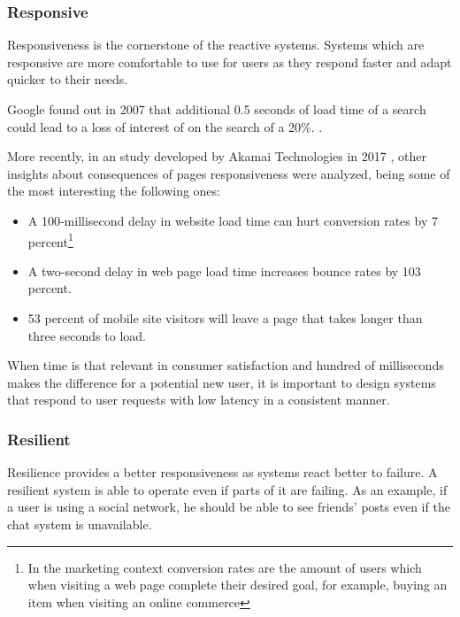 \documentclass[../main.tex]{subfiles}
\begin{document}
\subsubsection{Responsive}

Responsiveness is the cornerstone of the reactive
systems. Systems which are responsive are more comfortable to use for users as
they respond faster and adapt quicker to their needs.

Google found out in 2007 that additional 0.5 seconds of load time of a search
could lead to a loss of interest of on the search of a 20\%. \autocite{MayerGoogleYouTube}.

More recently, in an study developed by Akamai Technologies in 2017 \autocite{Akamai2017TheAkamai}, other
insights about consequences of pages responsiveness were analyzed, being some of the most
interesting the following ones:

\begin{itemize}
    \item A 100-millisecond delay in website load time can hurt conversion rates
by 7 percent\footnote{In the marketing context conversion rates are the amount of users
    which when visiting a web page complete their desired goal, for example, buying an item
    when visiting an online commerce}

    \item A two-second delay in web page load time increases bounce rates by 103
percent.

    \item 53 percent of mobile site visitors will leave a page that takes longer
than three seconds to load.
\end{itemize}

When time is that relevant in consumer satisfaction and hundred of milliseconds
makes the difference for a potential new user, it is important to design systems
that respond to user requests with low latency in a consistent manner.

\subsubsection{Resilient}

Resilience provides a better responsiveness as systems
react better to failure. A resilient system is able to operate even if parts of
it are failing. As an example, if a user is using a social network, he should be
able to see friends' posts even if the chat system is unavailable.
\end{document}
